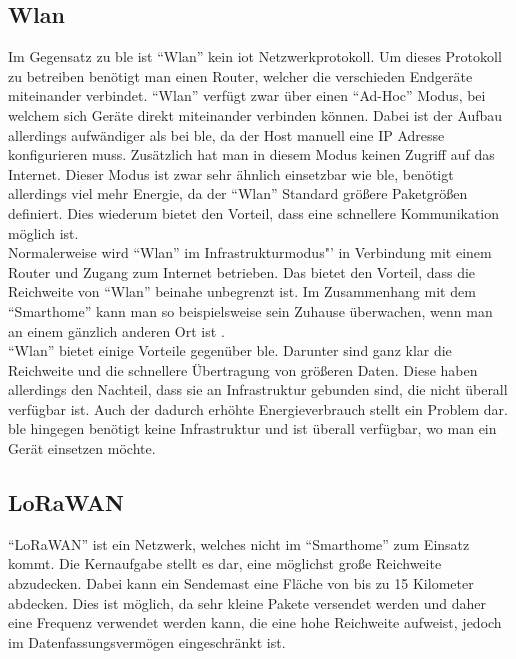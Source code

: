 \subsection{Wlan}
\label{ss:vergleich:wifi}

Im Gegensatz zu \ac{ble} ist "`Wlan"' kein \ac{iot} Netzwerkprotokoll. Um dieses Protokoll zu betreiben benötigt man einen Router, welcher die verschieden Endgeräte miteinander verbindet. "`Wlan"' verfügt zwar über einen "`Ad-Hoc"' Modus, bei welchem sich Geräte direkt miteinander verbinden können. Dabei ist der Aufbau allerdings aufwändiger als bei \ac{ble}, da der Host manuell eine IP Adresse konfigurieren muss. Zusätzlich hat man in diesem Modus keinen Zugriff auf das Internet. Dieser Modus ist zwar sehr ähnlich einsetzbar wie \ac{ble}, benötigt allerdings viel mehr Energie, da der "`Wlan"' Standard größere Paketgrößen definiert. Dies wiederum bietet den Vorteil, dass eine schnellere Kommunikation möglich ist.\\

\noindent Normalerweise wird "`Wlan"' im Infrastrukturmodus"' in Verbindung mit einem Router und Zugang zum Internet betrieben. Das bietet den Vorteil, dass die Reichweite von "`Wlan"' beinahe unbegrenzt ist. Im Zusammenhang mit dem "`Smarthome"' kann man so beispielsweise sein Zuhause überwachen, wenn man an einem gänzlich anderen Ort ist \cite{MUE:Wlan}.\\

\noindent "`Wlan"' bietet einige Vorteile gegenüber \ac{ble}. Darunter sind ganz klar die Reichweite und die schnellere Übertragung von größeren Daten. Diese haben allerdings den Nachteil, dass sie an Infrastruktur gebunden sind, die nicht überall verfügbar ist. Auch der dadurch erhöhte Energieverbrauch stellt ein Problem dar. \ac{ble} hingegen benötigt keine Infrastruktur und ist überall verfügbar, wo man ein Gerät einsetzen möchte.\\ 

\subsection{LoRaWAN}
\label{ss:vergleich:lora}

"`LoRaWAN"' ist ein Netzwerk, welches nicht im "`Smarthome"' zum Einsatz kommt. Die Kernaufgabe stellt es dar, eine möglichst große Reichweite abzudecken. Dabei kann ein Sendemast eine Fläche von bis zu 15 Kilometer abdecken. Dies ist möglich, da sehr kleine Pakete versendet werden und daher eine Frequenz verwendet werden kann, die eine hohe Reichweite aufweist, jedoch im Datenfassungsvermögen eingeschränkt ist.\\

